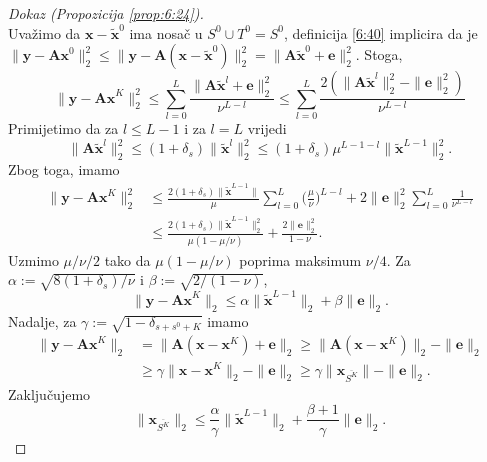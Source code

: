 \documentclass[a4paper,twoside,12pt]{memoir} %
\newcommand{\vect}[1]{\mathbf{#1}}
\renewcommand{\vec}{\vect}
\newcommand{\norm}[1]{\|{#1}\|}
\begin{document}
\begin{proof}[Dokaz (Propozicija \ref{prop:6:24})]
\begin{equation*}
    \end{equation*}
    \noindent
    Uva\v{z}imo da $\vec x - \tilde{\vec x}^0$ ima nosa\v{c} u $S^0 \cup T^0 = S^0$, definicija \eqref{6:40} implicira da je $\norm{\vec y - \vec {Ax}^0}_2^2 \leq \norm{\vec y - \vec A(\vec x - \tilde{\vec x}^0)}_2^2 = \norm{\vec A \tilde{\vec x}^0 + \vec e}_2^2$. Stoga,
    \begin{equation*}
        \norm{\vec y - \vec {Ax}^K}_2^2 \leq \sum_{l=0}^L \frac{\norm{\vec A \tilde{\vec x}^l + \vec e}_2^2}{\nu^{L-l}} \leq \sum_{l=0}^L \frac{2(\norm{\vec A \tilde{\vec x}^l}_2^2 - \norm{\vec e}_2^2)}{\nu^{L-l}}  
    \end{equation*}
    Primijetimo da za $l \leq L - 1$ i za $l = L$ vrijedi
    \begin{equation*}
        \norm{\vec A \tilde{\vec x}^l}_2^2 \leq (1+\delta_s)\norm{\tilde{\vec x}^l}_2^2 \leq (1+\delta_s)\mu^{L-1-l} \norm{\tilde{\vec x}^{L-1}}_2^2.
    \end{equation*}
    Zbog toga, imamo
    \begin{align*}
        \norm{\vec y - \vec{Ax}^K}_2^2 & \leq \frac{2(1+\delta_s)\norm{\tilde{\vec x}^{L-1}}}{\mu}\sum_{l=0}^L \bigg( \frac{\mu}{\nu} \bigg)^{L-l}+2 \norm{\vec e}_2^2 \sum_{l=0}^L \frac{1}{\nu^{L-l}}\\
        &\leq \frac{2(1+\delta_s)\norm{\tilde{\vec x}^{L-1}}_2^2}{\mu(1-\mu/\nu)}+ \frac{2\norm{\vec e}_2^2}{1-\nu}. 
    \end{align*}
    Uzmimo $\mu/\nu/2$ tako da $\mu(1-\mu/\nu)$ poprima maksimum $\nu/4$. Za $\alpha := \sqrt{8(1+\delta_s)/\nu}$ i $\beta := \sqrt{2/(1-\nu)}$,
    \begin{equation}\label{6:44}
        \norm{\vec y - \vec{Ax}^K}_2 \leq \alpha \norm{\tilde{\vec x}^{L-1}}_2 + \beta \norm{\vec e}_2.
    \end{equation}
    Nadalje, za $\gamma := \sqrt{1 - \delta_{s + s^0 + K}}$ imamo
    \begin{align*}
    \norm{\vec y - \vec{Ax}^K}_2 &= \norm{\vec A(\vec x - \vec x^K) + \vec e}_2 \geq \norm{\vec A(\vec x - \vec x^K)}_2 - \norm{\vec e}_2\\[0.5em]
        & \geq \gamma \norm{\vec x -  \vec x^K}_2 - \norm{\vec e}_2 \geq \gamma \norm{\vec x_{\overline{S^K}}} - \norm{\vec e}_2.
    \end{align*}
    Zaklju\v{c}ujemo
    \begin{equation}\label{6:45}
        \norm{\vec x_{\overline{S^K}}}_2 \leq \frac{\alpha}{\gamma} \norm{\tilde{\vec x}^{L-1}}_2 + \frac{\beta + 1}{\gamma} \norm{\vec e}_2.   

\end{equation}
\end{proof}
\end{document}
